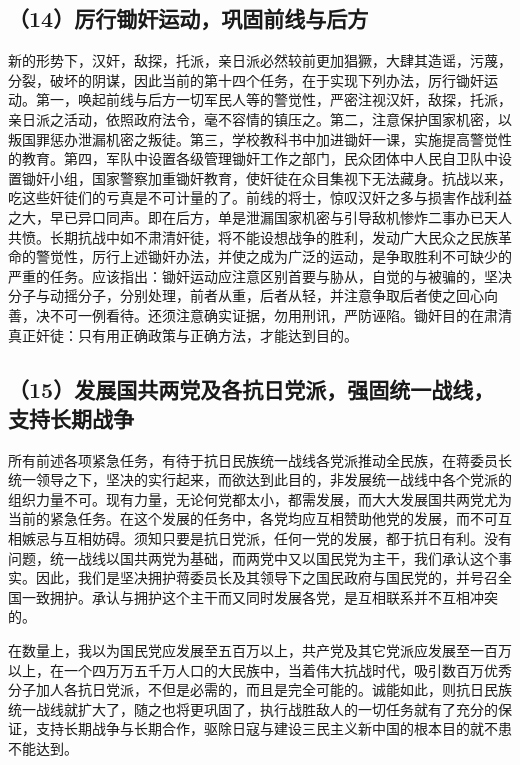 \subsection{（14）厉行锄奸运动，巩固前线与后方}

新的形势下，汉奸，敌探，托派，亲日派必然较前更加猖獗，大肆其造谣，污蔑，分裂，破坏的阴谋，因此当前的第十四个任务，在于实现下列办法，厉行锄奸运动。第一，唤起前线与后方一切军民人等的警觉性，严密注视汉奸，敌探，托派，亲日派之活动，依照政府法令，毫不容情的镇压之。第二，注意保护国家机密，以叛国罪惩办泄漏机密之叛徒。第三，学校教科书中加进锄奸一课，实施提高警觉性的教育。第四，军队中设置各级管理锄奸工作之部门，民众团体中人民自卫队中设置锄奸小组，国家警察加重锄奸教育，使奸徒在众目集视下无法藏身。抗战以来，吃这些奸徒们的亏真是不可计量的了。前线的将士，惊叹汉奸之多与损害作战利益之大，早已异口同声。即在后方，单是泄漏国家机密与引导敌机惨炸二事办已天人共愤。长期抗战中如不肃清奸徒，将不能设想战争的胜利，发动广大民众之民族革命的警觉性，厉行上述锄奸办法，并使之成为广泛的运动，是争取胜利不可缺少的严重的任务。应该指出：锄奸运动应注意区别首要与胁从，自觉的与被骗的，坚决分子与动摇分子，分别处理，前者从重，后者从轻，并注意争取后者使之回心向善，决不可一例看待。还须注意确实证据，勿用刑讯，严防诬陷。锄奸目的在肃清真正奸徒：只有用正确政策与正确方法，才能达到目的。

\subsection{（15）发展国共两党及各抗日党派，强固统一战线，支持长期战争}

所有前述各项紧急任务，有待于抗日民族统一战线各党派推动全民族，在蒋委员长统一领导之下，坚决的实行起来，而欲达到此目的，非发展统一战线中各个党派的组织力量不可。现有力量，无论何党都太小，都需发展，而大大发展国共两党尤为当前的紧急任务。在这个发展的任务中，各党均应互相赞助他党的发展，而不可互相嫉忌与互相妨碍。须知只要是抗日党派，任何一党的发展，都于抗日有利。没有问题，统一战线以国共两党为基础，而两党中又以国民党为主干，我们承认这个事实。因此，我们是坚决拥护蒋委员长及其领导下之国民政府与国民党的，并号召全国一致拥护。承认与拥护这个主干而又同时发展各党，是互相联系并不互相冲突的。

在数量上，我以为国民党应发展至五百万以上，共产党及其它党派应发展至一百万以上，在一个四万万五千万人口的大民族中，当着伟大抗战时代，吸引数百万优秀分子加人各抗日党派，不但是必需的，而且是完全可能的。诚能如此，则抗日民族统一战线就扩大了，随之也将更巩固了，执行战胜敌人的一切任务就有了充分的保证，支持长期战争与长期合作，驱除日寇与建设三民主义新中国的根本目的就不患不能达到。

